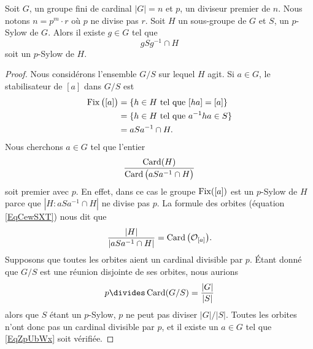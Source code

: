 \begin{lemma}       \label{LemwDYQMg}
    Soit \( G\), un groupe fini de cardinal \( | G |=n\) et \( p\), un diviseur premier de \( n\). Nous notons \( n=p^m\cdot r\) où \( p\) ne divise pas \( r\). Soit \( H\) un sous-groupe de \( G\) et \( S\), un \( p\)-Sylow de \( G\). Alors il existe \( g\in G\) tel que
    \begin{equation}
        gSg^{-1}\cap H
    \end{equation}
    soit un \( p\)-Sylow de \( H\).
\end{lemma}

\begin{proof}
    Nous considérons l'ensemble \( G/S\) sur lequel \( H\) agit. Si \( a\in G\), le stabilisateur de \( [a]\) dans \( G/S\) est
    \begin{subequations}
        \begin{align}
            \operatorname{Fix}\big( [a] \big)&=\{ h\in H\text{ tel que } [ha]=[a] \}\\
            &=\{ h\in H\text{ tel que } a^{-1}ha\in S\}\\
            &=aSa^{-1}\cap H.
        \end{align}
    \end{subequations}
    Nous cherchons \( a\in G\) tel que l'entier
    \begin{equation}        \label{EqZpUbWx}
        \frac{ \operatorname{Card}(H) }{ \operatorname{Card}\big( aSa^{-1}\cap H \big) }
    \end{equation}
    soit premier avec \( p\). En effet, dans ce cas le groupe \( \operatorname{Fix}([a])\) est un $p$-Sylow de \( H\) parce que \( | H:aSa^{-1}\cap H |\) ne divise pas \( p\). La formule des orbites (équation \eqref{EqCewSXT}) nous dit que
    \begin{equation}
        \frac{ | H | }{ | aSa^{-1}\cap H | }=\operatorname{Card}\big( \mathcal{O}_{[a]} \big).
    \end{equation}
    Supposons que toutes les orbites aient un cardinal divisible par \( p\). Étant donné que \( G/S\) est une réunion disjointe de ses orbites, nous aurions
    \begin{equation}
        p\divides \Card(G/S)=\frac{ | G | }{ | S | }
    \end{equation}
    alors que \( S\) étant un $p$-Sylow, \( p\) ne peut pas diviser \( | G |/| S |\). Toutes les orbites n'ont donc pas un cardinal divisible par \( p\), et il existe un \( a\in G\) tel que \eqref{EqZpUbWx} soit vérifiée.
\end{proof}



